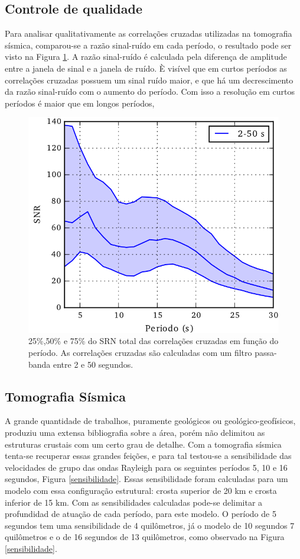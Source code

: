 \subsection{Controle de qualidade}

Para analisar qualitativamente as correlações cruzadas utilizadas na tomografia sísmica, comparou-se a razão sinal-ruído em cada período, o resultado pode ser visto na Figura \ref{SNR}. A razão sinal-ruído é calculada pela diferença de amplitude entre a janela de sinal e a janela de ruído. È visível que em curtos períodos as correlações cruzadas possuem um sinal ruído maior, e que há um decrescimento da razão sinal-ruído com o aumento do período. Com isso a resolução em curtos períodos é maior que em longos períodos,

\begin{figure}[!ht]
\centering
\includegraphics[scale=1]{Figs/SNR.png}
\caption{25\%,50\% e 75\% do  SRN total das correlações cruzadas em função do período. As correlações cruzadas são calculadas com um filtro passa-banda entre 2 e 50 segundos.}
\label{SNR}
\end{figure}

\subsection{Tomografia Sísmica}

A grande quantidade de trabalhos, puramente geológicos ou geológico-geofísicos, produziu uma extensa bibliografia sobre a área, porém não delimitou as estruturas crustais com um certo grau de detalhe. Com a tomografia sísmica tenta-se recuperar essas grandes feições, e para tal testou-se a sensibilidade das velocidades  de grupo das ondas Rayleigh para os seguintes períodos 5, 10 e 16 segundos, Figura \ref{sensibilidade}. Essas sensibilidade foram calculadas para um modelo com essa configuração estrutural: crosta superior de 20 km e crosta inferior de 15 km. Com as sensibilidades calculadas pode-se delimitar a profundidad de atuação de cada período, para este modelo. O período de 5 segundos tem uma sensibilidade de 4 quilômetros, já o modelo de 10 segundos 7 quilômetros e o de 16 segundos de 13 quilômetros, como observado na Figura \ref{sensibilidade}.

